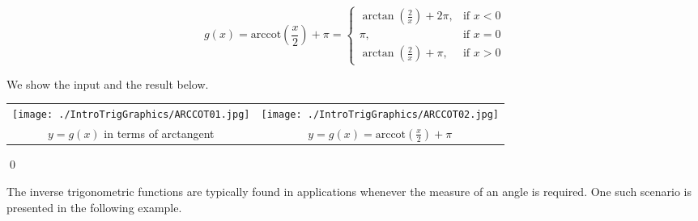 \begin{ex}
\begin{enumerate}
\begin{enumerate}
\[ g(x) = \text{arccot}\left(\frac{x}{2}\right) + \pi = \left\{ \begin{array}{rr} \arctan\left(\frac{2}{x}\right) + 2\pi, & \text{if $x<0$} \\ [5pt] \pi, & \text{if $x=0$} \\ [5pt] \arctan\left(\frac{2}{x}\right) + \pi, & \text{if $x>0$} \end{array}\right. \]

We show the input and the result below.

\smallskip

\begin{tabular}{cc}

\texttt{[image: ./IntroTrigGraphics/ARCCOT01.jpg]} &
\hspace{0.75in} \texttt{[image: ./IntroTrigGraphics/ARCCOT02.jpg]}  \\

$y=g(x)$ in terms of arctangent & \hspace{0.75in} $y = g(x) = \text{arccot}\left(\frac{x}{2}\right) + \pi $
\end{tabular} 

\end{enumerate}

\end{enumerate}

\qed
\end{ex}





The inverse trigonometric functions are typically found in applications whenever the measure of an angle is required.  One such scenario is presented in the following example.


